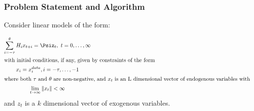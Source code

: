 \documentclass{beamer}
\begin{document}
\begin{frame}
  \frametitle{Problem Statement and Algorithm}
  
{\small  

Consider linear models of the form\cite{anderson10}:


\begin{gather}
\sum_{i=-\tau}^\theta{H_i x_{t+i}}= \Psi%
z_{t}, \,\, t = 0,\ldots,\infty\label{eq:canonical}\\ \intertext{with initial conditions, if any, given by constraints of the form}%
x_i  =  x^{data}_i,  i =  - \tau, \ldots, -1\label{eq:init}\\ \intertext{where both $\tau$ and $\theta$ are non-negative, and $x_t$ is an L dimensional vector 
of endogenous variables with}%
\lim_{ t \rightarrow\infty} \|x_t\|   < \infty\label{eq:limit} %
\end{gather}
{ and $z_t$ is a $k$ dimensional vector of exogenous variables.}

}

\end{frame}
\end{document}
